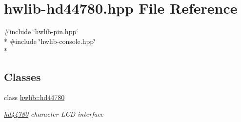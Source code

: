 \hypertarget{hwlib-hd44780_8hpp}{}\section{hwlib-\/hd44780.hpp File Reference}
\label{hwlib-hd44780_8hpp}
{\ttfamily \#include \char`\"{}hwlib-\/pin.\+hpp\char`\"{}}\\*
{\ttfamily \#include \char`\"{}hwlib-\/console.\+hpp\char`\"{}}\\*
\subsection*{Classes}
\begin{DoxyCompactItemize}
\item 
class \hyperlink{classhwlib_1_1hd44780}{hwlib\+::hd44780}
\begin{DoxyCompactList}\small\item\em \hyperlink{classhwlib_1_1hd44780}{hd44780} character L\+CD interface \end{DoxyCompactList}\end{DoxyCompactItemize}
